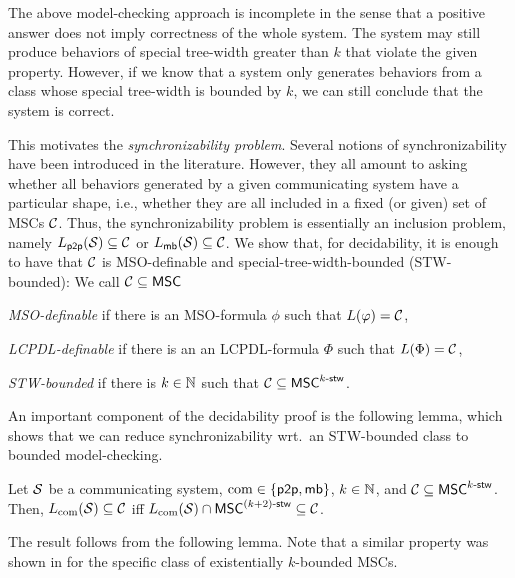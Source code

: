 \documentclass{article}
\begin{document}
The above model-checking approach is incomplete in the sense that
a positive answer does not imply correctness of the whole
system. The system may still produce behaviors of special tree-width greater than $k$
that violate the given property.
However, if we know that a system only generates
behaviors from a class whose special tree-width is bounded by $k$,
we can still conclude that the system is correct.

This motivates the \emph{synchronizability problem}.
Several notions of synchronizability have been introduced in the literature.
However, they all amount to asking whether all behaviors generated by
a given communicating system have a particular shape,
i.e., whether they are all included in a fixed (or given) set of MSCs $\mathcal{C}$.
Thus, the synchronizability problem is essentially an inclusion problem,
namely $L_{\mathsf{p2p}}(\mathcal{S}) \subseteq \mathcal{C}$ or $L_{\mathsf{mb}}(\mathcal{S}) \subseteq \mathcal{C}$.
%
We show that, for decidability, it is enough to have that $\mathcal{C}$
is MSO-definable and special-tree-width-bounded (STW-bounded):
%
We call $\mathcal{C} \subseteq \mathsf{MSC}$
\begin{enumerate*}[label={(\roman*)}]
\item \emph{MSO-definable} if there is
an MSO-formula $\phi$ such that $L(\varphi) = \mathcal{C}$,
\item \emph{LCPDL-definable} if there is an
an LCPDL-formula $\Phi$ such that $L(\Phi) = \mathcal{C}$,
\item \emph{STW-bounded} if there is $k \in \mathbb{N}$
such that $\mathcal{C} \subseteq \mathsf{MSC}^{k\textup{-}\mathsf{stw}}$.
\end{enumerate*}

An important component of the decidability proof is the following lemma,
which shows that we can reduce synchronizability
wrt.\ an STW-bounded class to bounded model-checking.

\begin{lemma}\label{lem:continuous}
Let $\mathcal{S}$ be a communicating system, $\textup{com} \in \{\mathsf{p2p}, \mathsf{mb}\}$,
$k \in \mathbb{N}$, and $\mathcal{C} \subseteq \mathsf{MSC}^{k\textup{-}\mathsf{stw}}$.
Then, $L_{\textup{com}}(\mathcal{S}) \subseteq \mathcal{C}$ iff
$L_{\textup{com}}(\mathcal{S}) \cap \mathsf{MSC}^{(k+2)\textup{-}\mathsf{stw}} \subseteq \mathcal{C}$.
\end{lemma}

The result follows from the following lemma.
Note that a similar property
was shown in \cite[Proposition~5.4]{GKM07} for the specific class of existentially
$k$-bounded MSCs.
\end{document}
